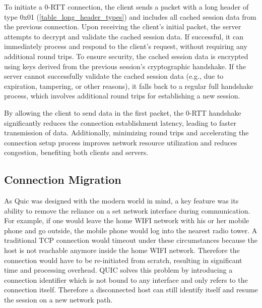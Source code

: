 To initiate a 0-RTT connection, the client sends a packet with a long header of type 0x01 (\ref{table_long_header_types}) and includes all cached session data from the previous connection. Upon receiving the client's initial packet, the server attempts to decrypt and validate the cached session data. If successful, it can immediately process and respond to the client's request, without requiring any additional round trips. To ensure security, the cached session data is encrypted using keys derived from the previous session's cryptographic handshake. If the server cannot successfully validate the cached session data (e.g., due to expiration, tampering, or other reasons), it falls back to a regular full handshake process, which involves additional round trips for establishing a new session.


By allowing the client to send data in the first packet, the 0-RTT handshake significantly reduces the connection establishment latency, leading to faster transmission of data. Additionally, minimizing round trips and accelerating the connection setup process improves network resource utilization and reduces congestion, benefiting both clients and servers.

\subsection{Connection Migration} \label{connection_migration}

As Quic was designed with the modern world in mind, a key feature was its ability to remove the reliance on a set network interface during communication. For example, if one would leave the home WIFI network with his or her mobile phone and go outside, the mobile phone would log into the nearest radio tower. A traditional TCP connection would timeout under these circumstances because the host is not reachable anymore inside the home WIFI network. Therefore the connection would have to be re-initiated from scratch, resulting in significant time and processing overhead. QUIC solves this problem by introducing a connection identifier which is not bound to any interface and only refers to the connection itself. Therefore a disconnected host can still identify itself and resume the session on a new network path.

